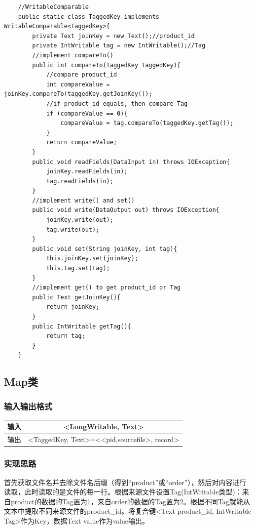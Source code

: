 \documentclass{article}
\begin{document}
\begin{lstlisting}
	//WritableComparable
	public static class TaggedKey implements WritableComparable<TaggedKey>{
		private Text joinKey = new Text();//product_id
		private IntWritable tag = new IntWritable();//Tag
		//implement compareTo()
		public int compareTo(TaggedKey taggedKey){
			//compare product_id
			int compareValue = joinKey.compareTo(taggedKey.getJoinKey());
			//if product_id equals, then compare Tag
			if (compareValue == 0){
				compareValue = tag.compareTo(taggedKey.getTag());
			}
			return compareValue;
		}
		public void readFields(DataInput in) throws IOException{
			joinKey.readFields(in);
			tag.readFields(in);
		}
		//implement write() and set()
		public void write(DataOutput out) throws IOException{
			joinKey.write(out);
			tag.write(out);
		}
		public void set(String joinKey, int tag){
			this.joinKey.set(joinKey);
			this.tag.set(tag);
		}
		//implement get() to get product_id or Tag
		public Text getJoinKey(){
			return joinKey;
		}
		public IntWritable getTag(){
			return tag;
		}
	}
\end{lstlisting}



\subsection{Map类}

\subsubsection{输入输出格式}

\begin{table}[htbp]
	\centering
	\begin{tabular}{cc}
		\toprule    输入 & <LongWritable, Text> \\
		\midrule   输出 & <TaggedKey, Text>=<<pid,sourcefile>, record> \\ 
		\bottomrule   
	\end{tabular}  
\end{table}

\subsubsection{实现思路}
首先获取文件名并去除文件名后缀（得到“product”或“order”），然后对内容进行读取，此时读取的是文件的每一行。根据来源文件设置Tag(IntWritable类型)：来自product的数据的Tag置为1，来自order的数据的Tag置为2。根据不同Tag就能从文本中提取不同来源文件的product\_id。将复合键<Text product\_id, IntWritable Tag>作为Key，数据Text value作为value输出。
\end{document}
